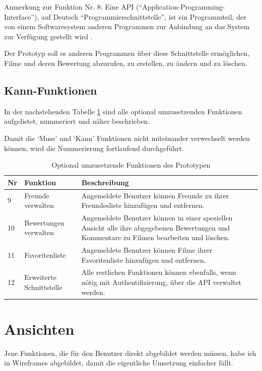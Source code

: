 Anmerkung zur Funktion Nr. 8: Eine API (``Application-Programming-Interface''), auf 
Deutsch ``Programmierschnittstelle'', ist ein Programmteil, der von einem Softwaresystem 
anderen Programmen zur Anbindung an das System zur Verfügung gestellt wird \cite{api}.

Der Prototyp soll es anderen Programmen über diese Schnittstelle ermöglichen,
Filme und deren Bewertung abzurufen, zu erstellen, zu ändern und zu löschen.

\subsection{Kann-Funktionen}
In der nachstehenden Tabelle \ref{tab:kann_funktionen} sind alle optional 
umzusetzenden Funktionen aufgelistet, nummeriert und näher beschrieben.

Damit die `Muss' und `Kann' Funktionen nicht miteinander verwechselt werden 
können, wird die Nummerierung fortlaufend durchgeführt.

\begin{table}[h]
\begin{center}
    \begin{tabular}{llp{8cm}l}
        \toprule Nr & Funktion & Beschreibung \\
        \midrule 9 & Freunde verwalten & Angemeldete Benutzer können Freunde
                     zu ihrer Freundesliste hinzufügen und entfernen. \\
        \midrule 10 & Bewertungen verwalten & Angemeldete Benutzer können
                     in einer speziellen Ansicht alle ihre abgegebenen Bewertungen
                     und Kommentare zu Filmen bearbeiten und löschen. \\
        \midrule 11 & Favoritenliste & Angemeldete Benutzer können Filme ihrer
                     Favoritenliste hinzufügen und entfernen. \\
        \midrule 12 & Erweiterte Schnittstelle & Alle restlichen Funktionen
                     können ebenfalls, wenn nötig mit Authentifizierung, über
                     die API verwaltet werden. \\
        \bottomrule
    \end{tabular}
    \caption{Optional umzusetzende Funktionen des Prototypen}
    \label{tab:kann_funktionen}
\end{center}
\end{table}

\section{Ansichten}
Jene Funktionen, die für den Benutzer direkt abgebildet werden müssen, habe
ich in Wireframes \cite{wireframe} abgebildet, damit die eigentliche Umsetzung 
einfacher fällt.

